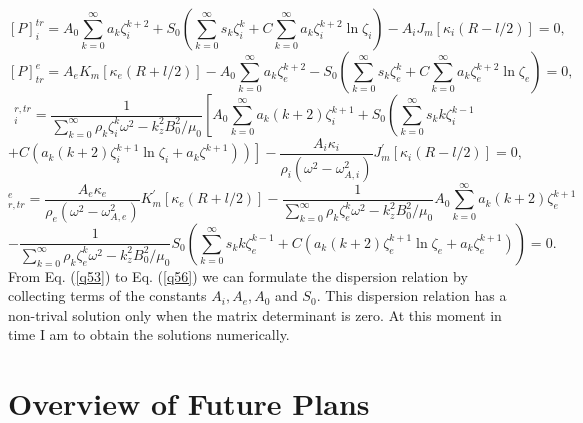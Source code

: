 \documentclass[12pt,a4paper,twoside]{article}
\begin{document}
\begin{equation}\label{q53}
[P]^{tr}_i =  A_0\sum^{\infty}_{k=0} a_k \zeta_i^{k+2}+S_0 \left( \sum^{\infty}_{k=0} s_k \zeta_i^k+ C\sum^{\infty}_{k=0} a_k \zeta_i^{k+2} \ln \zeta_i \right)-A_i J_m[ \kappa_i(R- l/2)]=0 ,
\end{equation}
\begin{equation}\label{q54}
[P]^e_{tr} = A_e K_m [\kappa_e(R+l/2)] -  A_0\sum^{\infty}_{k=0} a_k \zeta_e^{k+2}-S_0 \left( \sum^{\infty}_{k=0} s_k \zeta_e^k+ C\sum^{\infty}_{k=0} a_k \zeta_e^{k+2} \ln \zeta_e \right) = 0 ,
\end{equation}
\begin{equation*}
[\xi]^{r,tr}_i = \frac{1}{\sum^{\infty}_{k=0} \rho_k \zeta^k_{i} \omega^2-k_z^2 B_0^2/\mu_0} \left[ A_0 \sum^{\infty}_{k=0} a_k(k+2) \zeta_{i}^{k+1}+S_0 \left( \sum^{\infty}_{k=0} s_k k \zeta_{i}^{k-1}   \ \ \  \ \ \ \ \ \ \  \right. \right.  
\end{equation*}
\begin{equation}\label{q55}
+ \left. \left. C \left( a_k (k+2) \zeta_{i}^{k+1} \ln \zeta_{i}+ a_k \zeta^{k+1} \right) \right) \right]-\frac{A_i \kappa_i}{\rho_i(\omega^2-\omega_{A,i}^2)}J^{\prime}_m\left[ \kappa_i \left( R- l/2 \right) \right] = 0 ,
\end{equation}
\begin{equation*}
[\xi]^{e}_{r,tr} = \frac{A_e \kappa_e}{\rho_e (\omega^2-\omega^2_{A,e})} K^{\prime}_m[\kappa_e(R+l/2)] - \frac{1}{\sum^{\infty}_{k=0} \rho_k \zeta^k_{e} \omega^2-k_z^2 B_0^2/\mu_0}  A_0 \sum^{\infty}_{k=0} a_k (k+2) \zeta_{e}^{k+1}
\end{equation*} 
\begin{equation}\label{q56}
-\frac{1}{ \sum^{\infty}_{k=0} \rho_k \zeta^k_{e} \omega^2-k_z^2 B_0^2/\mu_0} S_0 \left( \sum^{\infty}_{k=0} s_k k \zeta_{e}^{k-1} +C \left( a_k (k+2) \zeta_{e}^{k+1} \ln \zeta_{e}+ a_k \zeta_e^{k+1} \right)  \right) = 0 .
\end{equation}
From Eq. (\ref{q53}) to Eq. (\ref{q56}) we can formulate the dispersion relation by collecting terms of the constants $A_i, A_e, A_0$ and $S_0$. This dispersion relation has a non-trival solution only when the matrix determinant is zero. At this moment in time I am to obtain the solutions numerically.
\section{Overview of Future Plans}
\end{document}
